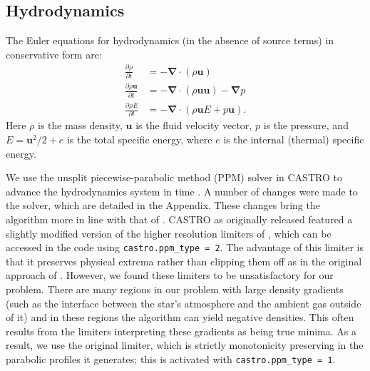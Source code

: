 \documentclass[12pt,preprint]{aastex}
\begin{document}
\subsection{Hydrodynamics}

The Euler equations for hydrodynamics (in the absence of source terms) in conservative form are:
\begin{align}
  \frac{\partial \rho}{\partial t} &= -\bm{\nabla} \cdot (\rho \mathbf{u}) \label{eq:euler_density}\\
  \frac{\partial \rho \mathbf{u}}{\partial t} &= -\bm{\nabla} \cdot (\rho \mathbf{u}\mathbf{u}) - \bm{\nabla}p \label{eq:euler_momentum}\\
  \frac{\partial \rho E}{\partial t} &= -\bm{\nabla}\cdot(\rho\mathbf{u}E + p\mathbf{u}). \label{eq:euler_energy}
\end{align}
Here $\rho$ is the mass density, $\mathbf{u}$ is the fluid velocity vector, $p$ is the pressure, and $E = \mathbf{u}^2 / 2 + e$ is the total specific energy, where $e$ is the internal (thermal) specific energy.

We use the unsplit piecewise-parabolic method (PPM) solver in CASTRO to advance the hydrodynamics system in time \citep{ppmunsplit}.  A number of changes were made to the solver, which are detailed in the Appendix.  These changes bring the algorithm more in line with that of \cite{ppm}. CASTRO as originally released featured a slightly modified version of the higher resolution limiters of \cite{colella_sekora:2008}, which can be accessed in the code using \texttt{castro.ppm\_type = 2}. The advantage of this limiter is that it preserves physical extrema rather than clipping them off as in the original approach of \cite{ppm}. However, we found these limiters to be unsatisfactory for our problem. There are many regions in our problem with large density gradients (such as the interface between the star's atmosphere and the ambient gas outside of it) and in these regions the algorithm can yield negative densities. This often results from the limiters interpreting these gradients as being true minima. As a result, we use the original limiter, which is strictly monotonicity preserving in the parabolic profiles it generates; this is activated with \texttt{castro.ppm\_type = 1}.
\end{document}
